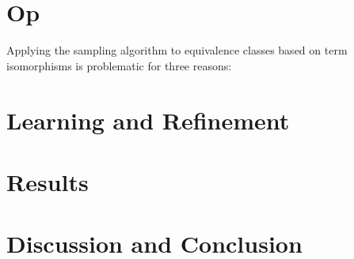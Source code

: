 \documentclass[conference]{IEEEtran}
\begin{document}
\section{Op}
Applying the sampling algorithm to equivalence classes based on term isomorphisms is problematic for three reasons: 



\section{Learning and Refinement}

\section{Results}

\section{Discussion and Conclusion}




\end{document}

